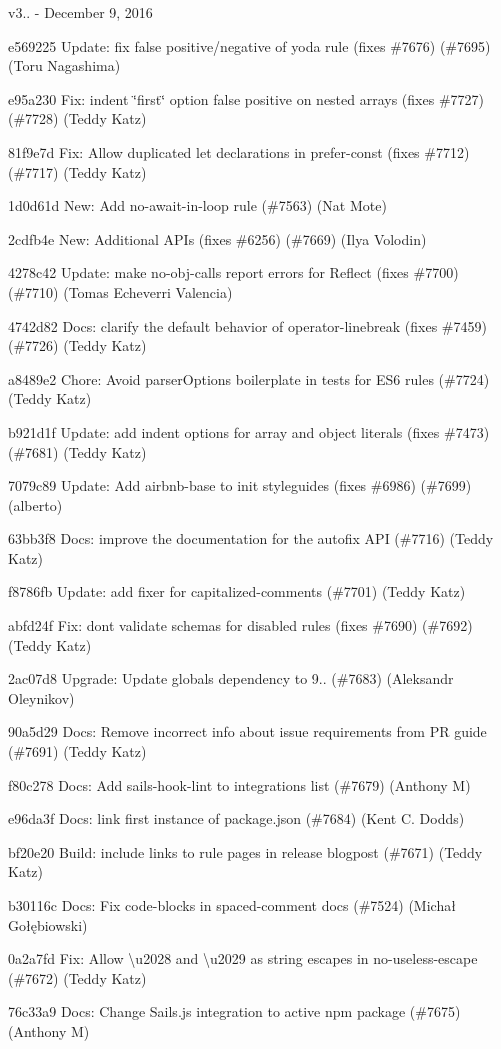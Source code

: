 v3.. -\/ December 9, 2016


\begin{DoxyItemize}
\item e569225 Update\+: fix false positive/negative of yoda rule (fixes \#7676) (\#7695) (Toru Nagashima)
\item e95a230 Fix\+: indent \char`\"{}first\char`\"{} option false positive on nested arrays (fixes \#7727) (\#7728) (Teddy Katz)
\item 81f9e7d Fix\+: Allow duplicated let declarations in {\ttfamily prefer-\/const} (fixes \#7712) (\#7717) (Teddy Katz)
\item 1d0d61d New\+: Add no-\/await-\/in-\/loop rule (\#7563) (Nat Mote)
\item 2cdfb4e New\+: Additional A\+P\+Is (fixes \#6256) (\#7669) (Ilya Volodin)
\item 4278c42 Update\+: make no-\/obj-\/calls report errors for Reflect (fixes \#7700) (\#7710) (Tomas Echeverri Valencia)
\item 4742d82 Docs\+: clarify the default behavior of {\ttfamily operator-\/linebreak} (fixes \#7459) (\#7726) (Teddy Katz)
\item a8489e2 Chore\+: Avoid parser\+Options boilerplate in tests for E\+S6 rules (\#7724) (Teddy Katz)
\item b921d1f Update\+: add {\ttfamily indent} options for array and object literals (fixes \#7473) (\#7681) (Teddy Katz)
\item 7079c89 Update\+: Add airbnb-\/base to init styleguides (fixes \#6986) (\#7699) (alberto)
\item 63bb3f8 Docs\+: improve the documentation for the autofix A\+PI (\#7716) (Teddy Katz)
\item f8786fb Update\+: add fixer for {\ttfamily capitalized-\/comments} (\#7701) (Teddy Katz)
\item abfd24f Fix\+: don\textquotesingle{}t validate schemas for disabled rules (fixes \#7690) (\#7692) (Teddy Katz)
\item 2ac07d8 Upgrade\+: Update globals dependency to 9.. (\#7683) (Aleksandr Oleynikov)
\item 90a5d29 Docs\+: Remove incorrect info about issue requirements from PR guide (\#7691) (Teddy Katz)
\item f80c278 Docs\+: Add sails-\/hook-\/lint to integrations list (\#7679) (Anthony M)
\item e96da3f Docs\+: link first instance of {\ttfamily package.\+json} (\#7684) (Kent C. Dodds)
\item bf20e20 Build\+: include links to rule pages in release blogpost (\#7671) (Teddy Katz)
\item b30116c Docs\+: Fix code-\/blocks in spaced-\/comment docs (\#7524) (Michał Gołębiowski)
\item 0a2a7fd Fix\+: Allow \textbackslash{}u2028 and \textbackslash{}u2029 as string escapes in no-\/useless-\/escape (\#7672) (Teddy Katz)
\item 76c33a9 Docs\+: Change Sails.\+js integration to active npm package (\#7675) (Anthony M)
\end{DoxyItemize}

